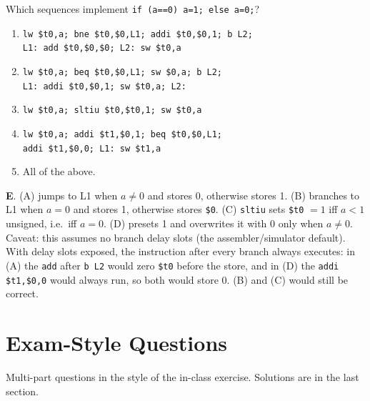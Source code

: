 \documentclass[11pt]{article}
\begin{document}
\begin{exercise}[C to MIPS]
Which sequences implement \texttt{if (a==0) a=1; else a=0;}?
\begin{enumerate}[label=(\Alph*),leftmargin=*]
  \item \texttt{lw \$t0,a; bne \$t0,\$0,L1; addi \$t0,\$0,1; b L2;}\\
        \texttt{L1: add \$t0,\$0,\$0; L2: sw \$t0,a}
  \item \texttt{lw \$t0,a; beq \$t0,\$0,L1; sw \$0,a; b L2;}\\
        \texttt{L1: addi \$t0,\$0,1; sw \$t0,a; L2:}
  \item \texttt{lw \$t0,a; sltiu \$t0,\$t0,1; sw \$t0,a}
  \item \texttt{lw \$t0,a; addi \$t1,\$0,1; beq \$t0,\$0,L1;}\\
        \texttt{addi \$t1,\$0,0; L1: sw \$t1,a}
  \item All of the above.
\end{enumerate}
\end{exercise}
\begin{solution}
\textbf{E}. (A) jumps to L1 when $a\neq0$ and stores 0, otherwise stores 1.
(B) branches to L1 when $a=0$ and stores 1, otherwise stores \texttt{\$0}.
(C) \texttt{sltiu} sets \texttt{\$t0} $=1$ iff $a<1$ unsigned, i.e.\ iff
$a=0$. (D) presets 1 and overwrites it with 0 only when $a\neq0$.
Caveat: this assumes no branch delay slots (the assembler/simulator
default). With delay slots exposed, the instruction after every branch
always executes: in (A) the \texttt{add} after \texttt{b L2} would zero
\texttt{\$t0} before the store, and in (D) the \texttt{addi \$t1,\$0,0}
would always run, so both would store 0. (B) and (C) would still be
correct.
\end{solution}

\section{Exam-Style Questions}

Multi-part questions in the style of the in-class exercise. Solutions are in
the last section.
\end{document}
